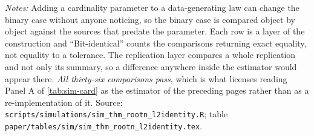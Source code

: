 \documentclass[
  12pt]{article}
\newcommand{\1}[1]{\mathds{1}\left[#1\right]}
\theoremstyle{plain}
\theoremstyle{definition}
\theoremstyle{definition}
\theoremstyle{remark}
\begin{document}
\begin{table}[!htbp]
\centering
\begin{threeparttable}
\caption{The binary panel against the pre-cardinality sources}
\label{tab:sim-l2identity}
\footnotesize

\begin{tablenotes}\footnotesize
\item \textit{Notes:} Adding a cardinality parameter to a data-generating law can
change the binary case without anyone noticing, so the binary case is compared
object by object against the sources that predate the parameter. Each row is a
layer of the construction and ``Bit-identical'' counts the comparisons returning
exact equality, not equality to a tolerance. The replication layer compares a
whole replication and not only its summary, so a difference anywhere inside the
estimator would appear there. \emph{All thirty-six comparisons pass}, which is
what licenses reading Panel A of \cref{tab:sim-card} as the estimator of the
preceding pages rather than as a re-implementation of it. Source:
\texttt{scripts/simulations/sim\_thm\_rootn\_l2identity.R}; table
\texttt{paper/tables/sim/sim\_thm\_rootn\_l2identity.tex}.
\end{tablenotes}
\end{threeparttable}
\end{table}
\end{document}
